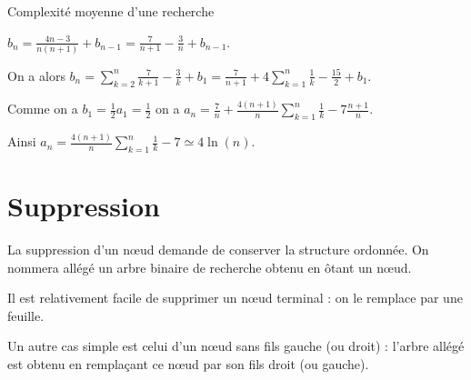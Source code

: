 \begin{exo}{Complexité moyenne d'une recherche}{}
\begin{itemize}
$\displaystyle b_n = \frac{4n-3}{n(n+1)} + b_{n-1}
 = \frac 7{n+1} - \frac 3n + b_{n-1}$.
 
On a alors $\displaystyle b_n = \sum_{k=2}^n \frac 7{k+1} - \frac 3k + b_1
=\frac 7{n+1} + 4\sum_{k=1}^n \frac 1k -\frac{15}2 + b_1$.

Comme on a $b_1=\frac 12 a_1= \frac 12$ on a 
$\displaystyle a_n =\frac 7n + \frac{4(n+1)}n\sum_{k=1}^n \frac 1k -7\frac {n+1}n$.

Ainsi $\displaystyle a_n = \frac{4(n+1)}n\sum_{k=1}^n \frac 1k -7 \simeq 4\ln(n)$.
\end{itemize}
\end{exo}
\section{Suppression}
La suppression d'un nœud demande de conserver la structure ordonnée. On nommera allégé un arbre binaire de recherche obtenu en ôtant un nœud.

Il est relativement facile de supprimer un nœud terminal : on le remplace par une feuille.

Un autre cas simple est celui d'un nœud sans fils gauche (ou droit) : l'arbre allégé est obtenu en remplaçant ce nœud par son fils droit (ou gauche).

